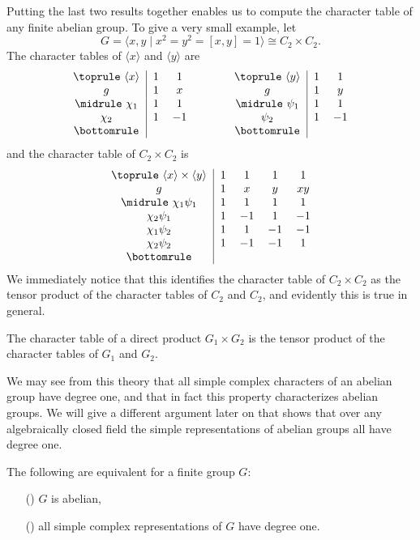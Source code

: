 \begin{example}
Putting the last two results together enables us to compute the character table of any finite abelian group. To give a very small example, let
\[G=\langle x,y\mid x^2=y^2=[x,y]=1\rangle\cong C_2\times C_2.\]
The character tables of $\langle x\rangle$ and $\langle y\rangle$ are
\[\begin{tabular}{c|cc}
\toprule
$\langle x\rangle$&$1$&$1$\\
$g$&$1$&$x$\\
\midrule
$\chi_1$&$1$&$1$\\
$\chi_2$&$1$&$-1$\\
\bottomrule
\end{tabular}\quad\quad\quad
\begin{tabular}{c|cc}
\toprule
$\langle y\rangle$&$1$&$1$\\
$g$&$1$&$y$\\
\midrule
$\psi_1$&$1$&$1$\\
$\psi_2$&$1$&$-1$\\
\bottomrule
\end{tabular}\]
and the character table of $C_2\times C_2$ is
\[\begin{tabular}{c|cccc}
\toprule
$\langle x\rangle\times\langle y\rangle$&$1$&$1$&$1$&$1$\\
$g$&$1$&$x$&$y$&$xy$\\
\midrule
$\chi_1\psi_1$&$1$&$1$&$1$&$1$\\
$\chi_2\psi_1$&$1$&$-1$&$1$&$-1$\\
$\chi_1\psi_2$&$1$&$1$&$-1$&$-1$\\
$\chi_2\psi_2$&$1$&$-1$&$-1$&$1$\\
\bottomrule
\end{tabular}\]
We immediately notice that this identifies the character table of $C_2\times C_2$ as the tensor product of the character tables of $C_2$ and $C_2$, and evidently this is true in general.
\end{example}
\begin{corollary}
The character table of a direct product $G_1\times G_2$ is the tensor product of the character tables of $G_1$ and $G_2$.
\end{corollary}
We may see from this theory that all simple complex characters of an abelian group have degree one, and that in fact this property characterizes abelian groups. We will give a different argument later on that shows that over any algebraically closed field the simple representations of abelian groups all have degree one.
\begin{proposition}\label{representation irr degree one iff abelian}
The following are equivalent for a finite group $G$:
\begin{itemize}
\item[(\rmnum{1})] $G$ is abelian,
\item[(\rmnum{2})] all simple complex representations of $G$ have degree one.
\end{itemize}
\end{proposition}
